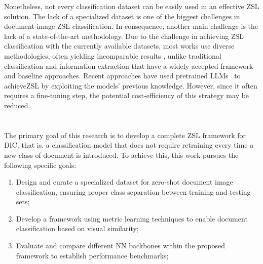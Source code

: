 Nonetheless, not every classification dataset can be easily used in an effective \gls{ZSL} solution. The lack of a specialized dataset is one of the biggest challenges in document-image \gls{ZSL} classification. In consequence, another main challenge is the lack of a state-of-the-art methodology. Due to the challenge in achieving \gls{ZSL} classification with the currently available datasets, most works use diverse methodologies, often yielding incomparable results \cite{sinha_cica_2024}, unlike traditional classification and information extraction that have a widely accepted framework and baseline approaches. Recent approaches have used pretrained \glspl{LLM}~\cite{scius-bertrand_zero-shot_2025} to achieve\gls{ZSL} by exploiting the models' previous knowledge. However, since it often requires a fine-tuning step, the potential cost-efficiency of this strategy may be reduced.


\section{}
\label{sec:objectives}

The primary goal of this research is to develop a complete \gls{ZSL} framework for \gls{DIC}, that is, a classification model that does not require retraining every time a new class of document is introduced. To achieve this, this work pursues the following specific goals:
\begin{enumerate}
    \item Design and curate a specialized dataset for zero-shot document image classification, ensuring proper class separation between training and testing sets;
    \item Develop a framework using metric learning techniques to enable document classification based on visual similarity;
    \item Evaluate and compare different \gls{NN} backbones within the proposed framework to establish performance benchmarks;
\end{enumerate}

\subsection{}

